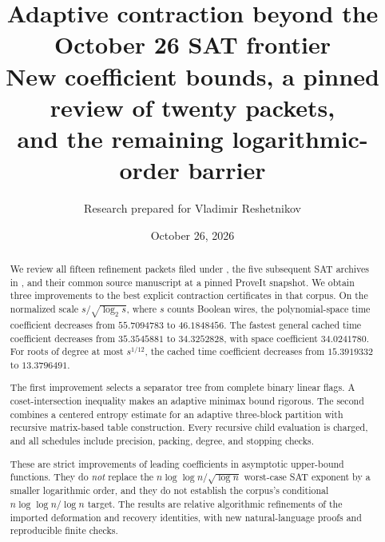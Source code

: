 \documentclass[11pt]{article}
\title{\color{ink}\textbf{Adaptive contraction beyond the\\October 26 SAT frontier}\\[7pt]
 \large New coefficient bounds, a pinned review of twenty packets,\\
 and the remaining logarithmic-order barrier}
\author{Research prepared for Vladimir Reshetnikov}
\date{October 26, 2026}
\theoremstyle{definition}\newtheorem{definition}[theorem]{Definition}
\theoremstyle{remark}\newtheorem{remark}[theorem]{Remark}
\begin{document}
\maketitle
\begin{abstract}
We review all fifteen refinement packets filed under
, the five subsequent SAT archives in
, and their common source manuscript at a pinned ProveIt
snapshot. We obtain three improvements to the best explicit contraction
certificates in that corpus. On the normalized scale
$s/\sqrt{\log_2s}$, where $s$ counts Boolean wires, the polynomial-space time
coefficient decreases from $55.7094783$ to $46.1848456$. The fastest general
cached time coefficient decreases from $35.3545881$ to $34.3252828$, with
space coefficient $34.0241780$. For roots of degree at most $s^{1/12}$,
the cached time coefficient decreases from $15.3919332$ to $13.3796491$.

The first improvement selects a separator tree from complete binary linear
flags. A coset-intersection inequality makes an adaptive minimax bound
rigorous. The second combines a centered entropy estimate for an adaptive
three-block partition with recursive matrix-based table construction.
Every recursive child evaluation is charged, and all schedules include
precision, packing, degree, and stopping checks.

These are strict improvements of leading coefficients in asymptotic
upper-bound functions. They do \emph{not} replace the
$n\log\log n/\sqrt{\log n}$ worst-case SAT exponent by a smaller
logarithmic order, and they do not establish the corpus's conditional
$n\log\log n/\log n$ target. The results are relative algorithmic
refinements of the imported deformation and recovery identities, with
new natural-language proofs and reproducible finite checks.
\end{abstract}
\clearpage
{\setlength{\parskip}{0pt}\tableofcontents}
\clearpage







\end{document}
